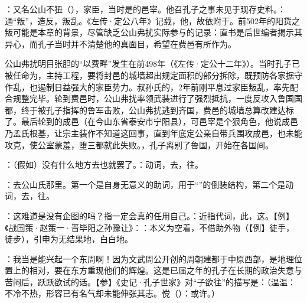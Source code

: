 {
\item {}：又名公山不狃（），家臣，当时是的邑宰。他召孔子之事未见于现存史料。：通“叛”，造反，叛乱。《左传·定公八年》记载，他，故依附于。前502年的阳货之叛可能是本章的背景，尽管缺乏公山弗扰实际参与的记录：直书是后世编者揭示其异心，而孔子当时并不清楚他的真面目，希望在费邑有所作为。%

公山弗扰明目张胆的“以费畔”发生在前498年（《左传·定公十二年》）。当时孔子已被任命为，主持工程，要将封邑的城墙超出规定面积的部分拆除，既预防各家据守作乱，也遏制日益强大的家臣势力。叔孙氏的，2年前刚平息过家臣叛乱，率先配合规整完毕。轮到费邑时，公山弗扰率领武装进行了强烈抵抗，一度反攻入鲁国国都，终于被孔子指挥的鲁军击败，公山弗扰逃到齐国，费邑的城墙总算改建达标了。最后轮到的成邑（在今山东省泰安市宁阳县），可邑宰是个狠角色，他说成邑乃孟氏根基，让宗主装作不知道这回事，直到年底定公亲自带兵围攻成邑，也未能攻克，使公室蒙羞，堕三都就此失败。，孔子离别了鲁国，开始在各国间。%

\item {}：（假如）没有什么地方去也就罢了。：动词，去，往。
\item {}：去公山氏那里。第一个是自身无意义的助词，用于“”的倒装结构，第二个是动词，去，往。
\item {}：这难道是没有企图的吗？指一定会真的任用自己。：近指代词，此，这。【例】《战国策·赵策一·晋毕阳之孙豫让》：：本义为空着，不借助外物（【例】徒手，徒步），引申为无结果地，白白地。
\item {}：我当是能兴起一个东周啊！因为文武周公开创的周朝建都于中原西部，是地理位置上的相对，要在东方重现他们的辉煌。这是已届之年的孔子在长期的政治失意与苦闷后，跃跃欲试的话。【参】《史记·孔子世家》对“子欲往”的描写是：（温温：不冷不热，形容已有名气却未能伸张其志。傥（）：或许。）
}
{}


